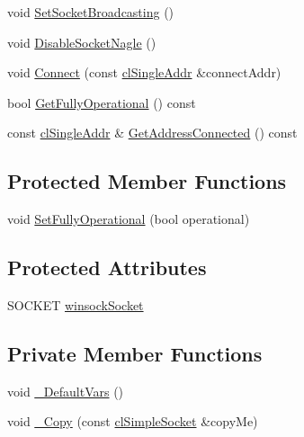 \begin{DoxyCompactItemize}
\item 
void \hyperlink{classcl_simple_socket_a89ee7fa04674f62171a56656d88a4506}{SetSocketBroadcasting} ()
\item 
void \hyperlink{classcl_simple_socket_ae0df60ffe1092810579c2a6b22db05a0}{DisableSocketNagle} ()
\item 
void \hyperlink{classcl_simple_socket_ac5835cca7d7c9cfac0db637a46ca7f5a}{Connect} (const \hyperlink{classcl_single_addr}{clSingleAddr} \&connectAddr)
\item 
bool \hyperlink{classcl_simple_socket_a084017b2735b6e702832fd0318058289}{GetFullyOperational} () const 
\item 
const \hyperlink{classcl_single_addr}{clSingleAddr} \& \hyperlink{classcl_simple_socket_aed24f0104189cb13e014f36692995038}{GetAddressConnected} () const 
\end{DoxyCompactItemize}
\subsection*{Protected Member Functions}
\begin{DoxyCompactItemize}
\item 
void \hyperlink{classcl_simple_socket_a1f422add7ea457cd021356ae406ecd0c}{SetFullyOperational} (bool operational)
\end{DoxyCompactItemize}
\subsection*{Protected Attributes}
\begin{DoxyCompactItemize}
\item 
SOCKET \hyperlink{classcl_simple_socket_a109af953439a5f88d198f3764e0077b2}{winsockSocket}
\end{DoxyCompactItemize}
\subsection*{Private Member Functions}
\begin{DoxyCompactItemize}
\item 
void \hyperlink{classcl_simple_socket_ad535ecb38b4ceb63a98d2ed3106ac792}{\_\-DefaultVars} ()
\item 
void \hyperlink{classcl_simple_socket_a911c27d4a649018243b7354a6f1467e8}{\_\-Copy} (const \hyperlink{classcl_simple_socket}{clSimpleSocket} \&copyMe)
\end{DoxyCompactItemize}
